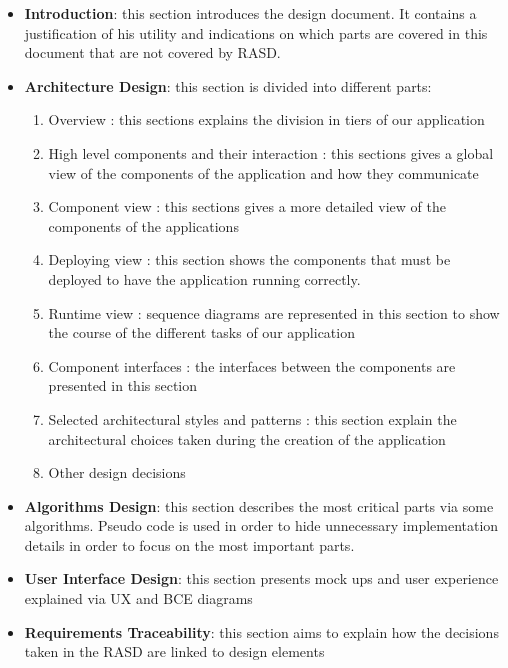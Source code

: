 \documentclass[a4paper]{article}
\begin{document}
\begin{itemize}
    \item \textbf{Introduction}: this section introduces the design document. It contains
a justification of his utility and indications on which parts are covered in
this document that are not covered by RASD.

\item \textbf{Architecture Design}: this section is divided into different parts:
\begin{enumerate}
    \item Overview : this sections explains the division in tiers of our application
    
    \item High level components and their interaction : this sections gives
a global view of the components of the application and how they
communicate

    \item Component view : this sections gives a more detailed view of the
components of the applications

    \item Deploying view : this section shows the components that must be
deployed to have the application running correctly.

    \item Runtime view : sequence diagrams are represented in this section to
show the course of the different tasks of our application

    \item Component interfaces : the interfaces between the components are
presented in this section

    \item Selected architectural styles and patterns : this section explain the
architectural choices taken during the creation of the application

    \item Other design decisions
    
\end{enumerate}


\item \textbf{Algorithms Design}: this section describes the most critical parts via
some algorithms. Pseudo code is used in order to hide unnecessary implementation
details in order to focus on the most important parts.


\item \textbf{User Interface Design}: this section presents mock ups and user experience
explained via UX and BCE diagrams


\item \textbf{Requirements Traceability}: this section aims to explain how the decisions
taken in the RASD are linked to design elements
\end{itemize}
\end{document}

